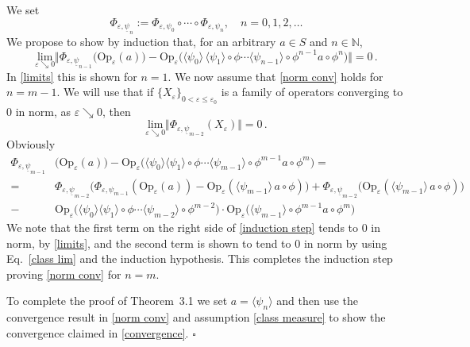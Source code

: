 \documentclass[11pt]{article}
\begin{document}
We set
$$\Phi_{\varepsilon, \underline{\psi}_n} := \Phi_{\varepsilon, \psi_0}\circ \cdots \circ \Phi_{\varepsilon, \psi_n}, \quad n=0,1,2, \dots$$
We propose to show by induction that, for an arbitrary $a\in S$ and $n\in \mathbb{N}$,
\begin{equation}\label{norm conv}
\underset{\varepsilon\searrow 0}{\text{lim}}\Vert \Phi_{\varepsilon, \underline{\psi}_{n-1}}(\text{Op}_{\varepsilon}(a)\big)
- \text{Op}_{\varepsilon}\big(\langle \psi_0 \rangle\,\langle \psi_1 \rangle \circ \phi \cdots \langle \psi_{n-1}\rangle \circ
\phi^{n-1} a\circ \phi^{n}\big)\Vert = 0\,.
\end{equation}
In \eqref{limits} this is shown for $n=1$. We now assume that \eqref{norm conv} holds for $n=m-1$. We will use that if 
$\{X_{\varepsilon}\}_{0<\varepsilon \leq \varepsilon_0}$ is a family of operators converging to 0 in norm, as 
$\varepsilon \searrow 0$, then 
\begin{equation}\label{zero}
\underset{\varepsilon\searrow 0}{\text{lim}}\Vert\Phi_{\varepsilon, \underline{\psi}_{m-2}}(X_{\varepsilon})\Vert =0\,.
\end{equation}
Obviously
\begin{align}
\Phi_{\varepsilon, \underline{\psi}_{m-1}}& \big(\text{Op}_{\varepsilon}(a) \big)-
\text{Op}_{\varepsilon}\big(\langle \psi_0\rangle \langle \psi_1\rangle \circ \phi \cdots \langle \psi_{m-1}\rangle \circ \phi^{m-1} a\circ \phi^{m}\big) = \qquad\quad \nonumber \\
= & \Phi_{\varepsilon,\underline{\psi}_{m-2}} \big(\Phi_{\varepsilon, \psi_{m-1}}(\text{Op}_{\varepsilon} (a))- 
\text{Op}_{\varepsilon}(\langle \psi_{m-1}\rangle\, a \circ \phi)\big) + \Phi_{\varepsilon, \underline{\psi}_{m-2}} 
\big(\text{Op}_{\varepsilon}(\langle \psi_{m-1} \rangle\, a \circ \phi)\big) \nonumber \\
- &\text{Op}_{\varepsilon}\big(\langle \psi_0 \rangle \langle \psi_1 \rangle \circ \phi \cdots \langle \psi_{m-2} \rangle 
\circ \phi^{m-2}\big)\cdot \text{Op}_{\varepsilon}\big( \langle \psi_{m-1} \rangle \circ \phi^{m-1} a \circ \phi^{m}\big)
\label{induction step}
\end{align}
We note that the first term on the right side of \eqref{induction step} tends to 0 in norm, by \eqref{limits}, 
and the second term is shown to tend to 0 in norm by using Eq.~\eqref{class lim} and the induction hypothesis. This completes
the induction step proving \eqref{norm conv} for $n=m$.

To complete the proof of Theorem~3.1 we set $a=\langle \psi_n \rangle$ and then use the convergence result 
in \eqref{norm conv} and assumption \eqref{class measure} to show the convergence claimed in \eqref{convergence}.
\hfill$\square$
\end{document}
